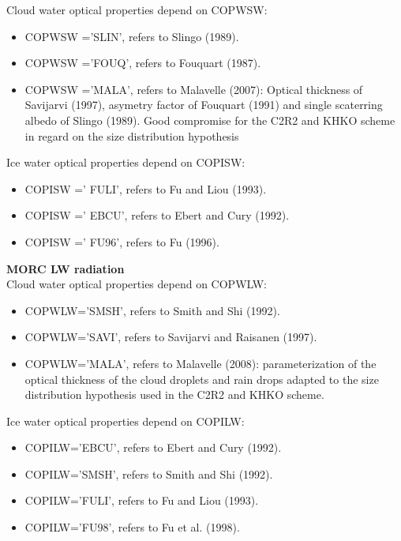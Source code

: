 Cloud water optical properties depend on COPWSW:

\begin{itemize}

\item COPWSW ='SLIN', refers to Slingo (1989).

\item COPWSW ='FOUQ', refers to Fouquart (1987).

 \item COPWSW ='MALA', refers to Malavelle (2007): Optical thickness of Savijarvi (1997), asymetry factor of Fouquart (1991) and single scaterring albedo of Slingo (1989). Good compromise for the C2R2 and KHKO scheme in regard on the size distribution hypothesis

\end{itemize}

Ice water optical properties depend on COPISW:
\begin{itemize}

\item COPISW =' FULI', refers to Fu and Liou (1993).

\item COPISW =' EBCU', refers to Ebert and Cury (1992).

\item COPISW =' FU96', refers to Fu (1996).

\end{itemize}


{\bf MORC LW radiation} \\

Cloud water optical properties depend on COPWLW:
\begin{itemize}

\item COPWLW='SMSH', refers to Smith and Shi (1992).

\item COPWLW='SAVI', refers to Savijarvi and Raisanen (1997).

\item COPWLW='MALA', refers to Malavelle (2008): parameterization of the optical thickness of the cloud droplets and rain drops adapted to the size distribution hypothesis used in the C2R2 and KHKO scheme.

\end{itemize}

Ice water optical properties depend on COPILW:
\begin{itemize}
\item COPILW='EBCU', refers to Ebert and Cury (1992).

\item COPILW='SMSH', refers to Smith and Shi (1992).

\item COPILW='FULI', refers to Fu and Liou (1993).

\item COPILW='FU98', refers to Fu et al. (1998).
\end{itemize}

